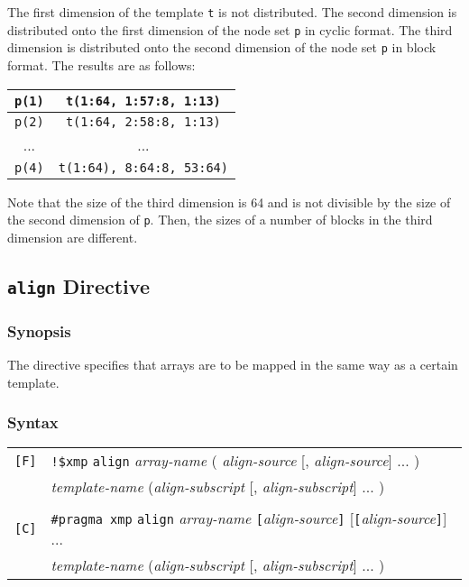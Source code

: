 \begin{description}
The first dimension of the template {\tt t} is not distributed. The
second dimension is distributed onto the first dimension of the node set
{\tt p} in cyclic format. The third dimension is distributed onto the
second dimension of the node set {\tt p} in block format. The results
are as follows:

\begin{center}
\begin{tabular}{|c|c|}
\hline
{\tt p(1)} & {\tt t(1:64, 1:57:8, 1:13)} \\
\hline
{\tt p(2)} & {\tt t(1:64, 2:58:8, 1:13)} \\
\hline
... & ... \\
\hline
{\tt p(4)} & {\tt t(1:64), 8:64:8, 53:64)} \\
\hline
\end{tabular}
\end{center}

Note that the size of the third dimension is 64 and is not divisible by
the size of the second dimension of {\tt p}. Then, the sizes of a number
of blocks in the third dimension are different.

\end{description}

\subsection{{\tt align} Directive}
\label{sub:align}

\subsubsection*{Synopsis}
The {\tt {}} directive specifies that arrays are to be
mapped in the same way as a certain template.

\subsubsection*{Syntax}

\begin{tabular}{ll}
\verb![F]! & \verb|!$xmp| {\tt align} {\it array-name}
( {\it align-source} [, {\it align-source}] ... ) \\
 & \hspace{3cm}{\tt with} {\it template-name}
({\it align-subscript} [, {\it align-subscript}] ... ) \\
 & \\
\verb![C]! & \verb|#pragma xmp| {\tt align} {\it array-name} 
{\tt [}{\it align-source}{\tt ]} [{\tt [}{\it align-source}{\tt ]}] ... \\
 & \hspace{3cm}{\tt with} {\it template-name}
({\it align-subscript} [, {\it align-subscript}] ... ) \\
\end{tabular}
\vspace{0.3cm}

